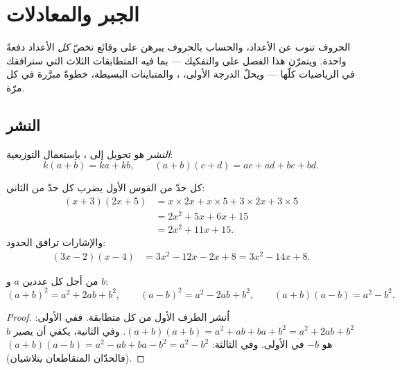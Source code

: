 \chapter{الجبر والمعادلات}\label{ch:g9:algebra}

الحروف تنوب عن الأعداد، والحساب بالحروف يبرهن على وقائع تخصّ
\emph{كل} الأعداد دفعةً واحدة. ويتمرّن هذا الفصل على 
والتفكيك --- بما فيه المتطابقات الثلاث التي سترافقك في الرياضيات
كلّها --- ويحلّ  الدرجة الأولى، 
، والمتباينات البسيطة، خطوةً مبرَّرة في كل مرّة.

\section{النشر}

\begin{definition}[النشر]\label{def:g9:algebra:expand}
\emph{النشر} هو تحويل  إلى ،
باِستعمال التوزيعية:
\[
k(a + b) = ka + kb,
\qquad
(a + b)(c + d) = ac + ad + bc + bd .
\]
\end{definition}

\begin{example}\label{ex:g9:algebra:expand}
كل حدّ من القوس الأول يضرب كل حدّ من الثاني:
\begin{align*}
(x + 3)(2x + 5)
&= x \times 2x + x \times 5 + 3 \times 2x + 3 \times 5 \\
&= 2x^2 + 5x + 6x + 15 \\
&= 2x^2 + 11x + 15 .
\end{align*}
والإشارات ترافق الحدود:
\begin{align*}
(3x - 2)(x - 4)
&= 3x^2 - 12x - 2x + 8
= 3x^2 - 14x + 8 .
\end{align*}
\end{example}

\begin{theorem}\label{thm:g9:algebra:identities}
من أجل كل عددين $a$ و $b$:
\[
(a+b)^2 = a^2 + 2ab + b^2,
\qquad
(a-b)^2 = a^2 - 2ab + b^2,
\qquad
(a+b)(a-b) = a^2 - b^2 .
\]
\end{theorem}

\begin{proof}
اُنشر الطرف الأول من كل متطابقة. ففي الأولى:
$(a+b)(a+b) = a^2 + ab + ba + b^2 = a^2 + 2ab + b^2$. وفي الثانية،
يكفي أن يصير $b$ هو $-b$ في الأولى. وفي الثالثة:
$(a+b)(a-b) = a^2 - ab + ba - b^2 = a^2 - b^2$ (فالحدّان المتقاطعان
يتلاشيان).
\end{proof}

